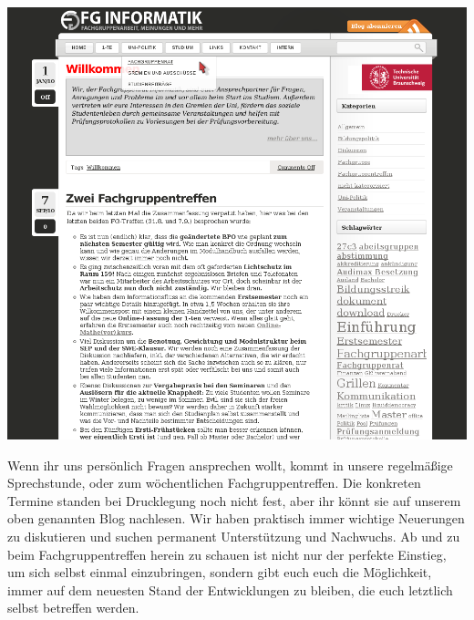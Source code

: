\includegraphics[width=\columnwidth]{bilder/fgblog.png}

Wenn ihr uns persönlich Fragen ansprechen wollt, kommt 
in unsere regelmäßige Sprechstunde, oder zum wöchentlichen Fachgruppentreffen.
Die konkreten Termine standen bei Drucklegung noch nicht fest, aber ihr könnt
sie auf unserem oben genannten Blog nachlesen. Wir haben praktisch immer wichtige 
Neuerungen zu diskutieren und suchen permanent Unterstützung und 
Nachwuchs. Ab und zu beim Fachgruppentreffen herein zu schauen ist 
nicht nur der perfekte Einstieg, um sich selbst einmal einzubringen, 
sondern gibt euch euch die Möglichkeit, immer auf dem neuesten Stand 
der Entwicklungen zu bleiben, die euch letztlich selbst betreffen werden.
